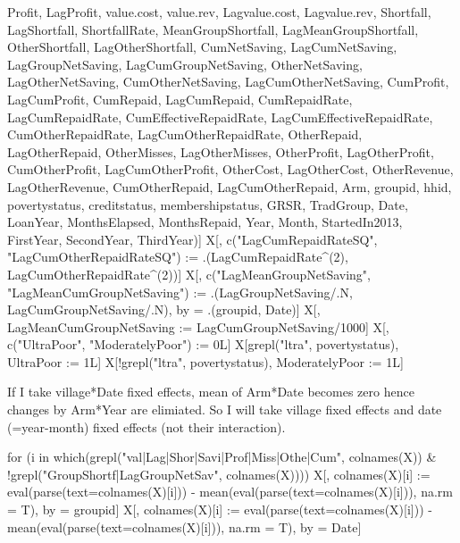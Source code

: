 \begin{Schunk}
\begin{Sinput}
    Profit, LagProfit, value.cost, value.rev, Lagvalue.cost, Lagvalue.rev, 
    Shortfall, LagShortfall, ShortfallRate, 
    MeanGroupShortfall, LagMeanGroupShortfall, OtherShortfall, LagOtherShortfall,
    CumNetSaving, LagCumNetSaving, 
    LagGroupNetSaving, LagCumGroupNetSaving, 
    OtherNetSaving, LagOtherNetSaving, 
    CumOtherNetSaving, LagCumOtherNetSaving, 
    CumProfit, LagCumProfit,
    CumRepaid, LagCumRepaid, 
    CumRepaidRate, LagCumRepaidRate, 
    CumEffectiveRepaidRate, LagCumEffectiveRepaidRate, 
    CumOtherRepaidRate, LagCumOtherRepaidRate, 
    OtherRepaid, LagOtherRepaid, OtherMisses, LagOtherMisses, 
    OtherProfit, LagOtherProfit, CumOtherProfit, LagCumOtherProfit,
    OtherCost, LagOtherCost, OtherRevenue, LagOtherRevenue,
    CumOtherRepaid, LagCumOtherRepaid, 
    Arm, groupid, hhid, povertystatus, creditstatus, membershipstatus, GRSR,
    TradGroup, Date, LoanYear,
    MonthsElapsed, MonthsRepaid, Year, Month, StartedIn2013,
    FirstYear, SecondYear, ThirdYear)]
X[, c("LagCumRepaidRateSQ", "LagCumOtherRepaidRateSQ") := 
  .(LagCumRepaidRate^(2), LagCumOtherRepaidRate^(2))]
X[, c("LagMeanGroupNetSaving", "LagMeanCumGroupNetSaving") := 
  .(LagGroupNetSaving/.N, LagCumGroupNetSaving/.N), by = .(groupid, Date)]
X[, LagMeanCumGroupNetSaving := LagCumGroupNetSaving/1000]
X[, c("UltraPoor", "ModeratelyPoor") := 0L]
X[grepl("ltra", povertystatus), UltraPoor := 1L]
X[!grepl("ltra", povertystatus), ModeratelyPoor := 1L]
\end{Sinput}
\end{Schunk}
If I take village*Date fixed effects, mean of Arm*Date becomes zero hence changes by Arm*Year are elimiated. So I will take village fixed effects and date (=year-month) fixed effects (not their interaction).
\begin{Schunk}
\begin{Sinput}
for (i in which(grepl("val|Lag|Shor|Savi|Prof|Miss|Othe|Cum", colnames(X)) & 
 !grepl("GroupShortf|LagGroupNetSav", colnames(X)))) {
  X[, colnames(X)[i] := eval(parse(text=colnames(X)[i])) - 
    mean(eval(parse(text=colnames(X)[i])), na.rm = T), 
    by = groupid]
  X[, colnames(X)[i] := eval(parse(text=colnames(X)[i])) - 
    mean(eval(parse(text=colnames(X)[i])), na.rm = T), 
    by = Date]
}
\end{Sinput}
\end{Schunk}
